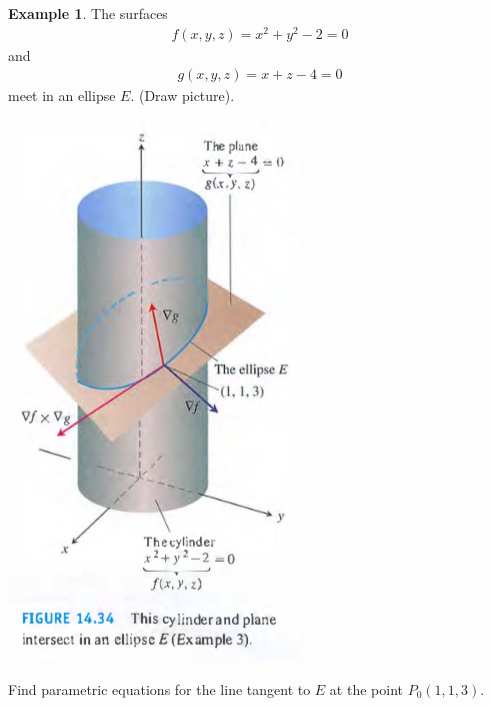 \documentclass[12pt, letter]{article}
\theoremstyle{plain}
\numberwithin{theorem}{section}
\theoremstyle{definition}
\newtheorem{example}[theorem]{Example}
\begin{document}
\begin{example}
The surfaces
\begin{align*}
f(x,y,z) = x^2+y^2-2=0
\end{align*}
and
\begin{align*}
g(x,y,z) = x+z-4=0
\end{align*}
meet in an ellipse $E$. (Draw picture).

\bigskip

\begin{center}
\includegraphics[scale=0.7]{m2_f8}
\end{center}

\bigskip

Find parametric equations for the line tangent to $E$ at the point $P_0(1,1,3)$.

\bigskip


\end{example}
\end{document}
